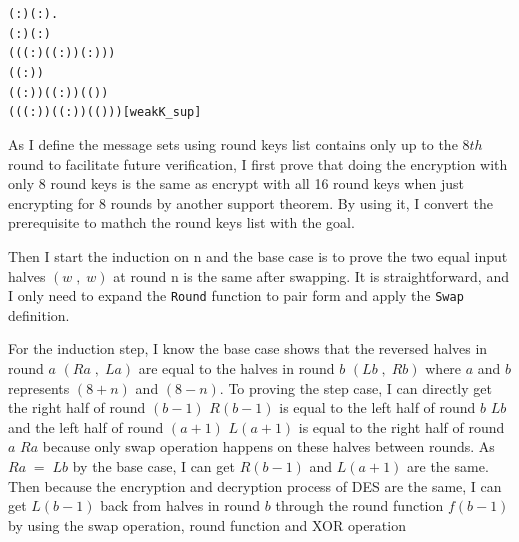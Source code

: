 \documentclass{article}
\begin{document}
\begin{alltt}
\HOLTokenTurnstile{} \HOLSymConst{\HOLTokenForall{}}( :) ( :).
        \HOLSymConst{\HOLTokenConj{}} ( :) \HOLSymConst{\HOLTokenLeq{}}  \HOLSymConst{\HOLTokenConj{}}  \HOLSymConst{\HOLTokenLeq{}} ( :) \HOLSymConst{\HOLTokenConj{}}
      ( ( ( :) (  ( :)) ( :))) \HOLSymConst{=}
     (( :)\HOLSymConst{,}) \HOLSymConst{\HOLTokenImp{}}
      (( :) \HOLSymConst{\ensuremath{-}} ) (  ( :)) ( ( )) \HOLSymConst{=}
       ( (( :) \HOLSymConst{\ensuremath{+}} ) (  ( :)) ( ( )))\hfill{[weakK_sup]}
\end{alltt}

As I define the message sets using round keys list contains only up to the $8th$ round to facilitate future verification,
I first prove that doing the encryption with only 8 round keys is the same as encrypt with all 16 round keys
when just encrypting for 8 rounds by another support theorem. By using it, I convert the prerequisite to mathch the
round keys list with the goal.

Then I start the induction on n and the base case is to prove the two equal input halves $(w\;,\;w)$ at round n is the same after
swapping. It is straightforward, and I only need to expand the \verb|Round| function to pair form and apply the \verb|Swap| definition.

For the induction step, I know the base case shows that the reversed halves in round $a$ $(Ra\;,\; La)$ are equal to
the halves in round $b$ $(Lb\;,\;Rb)$ where $a$ and $b$ represents $(8+n)$ and $(8-n)$.
To proving the step case, I can directly get the right half of round $(b-1)$ $R(b-1)$ is equal to the left half of round $b$
$Lb$ and
the left half of round $(a+1)$ $L(a+1)$ is equal to the right half of round $a$ $Ra$ because only swap operation happens on
these halves between rounds. As $Ra\;= \; Lb$ by the base case, I can get $R(b-1)$ and $L(a+1)$ are the same.
Then because the encryption and decryption process of DES are the same, I can get $L(b-1)$ back from halves in round $b$ through
the round function $f(b-1)$ by using the swap operation, round function and XOR operation
\end{document}
